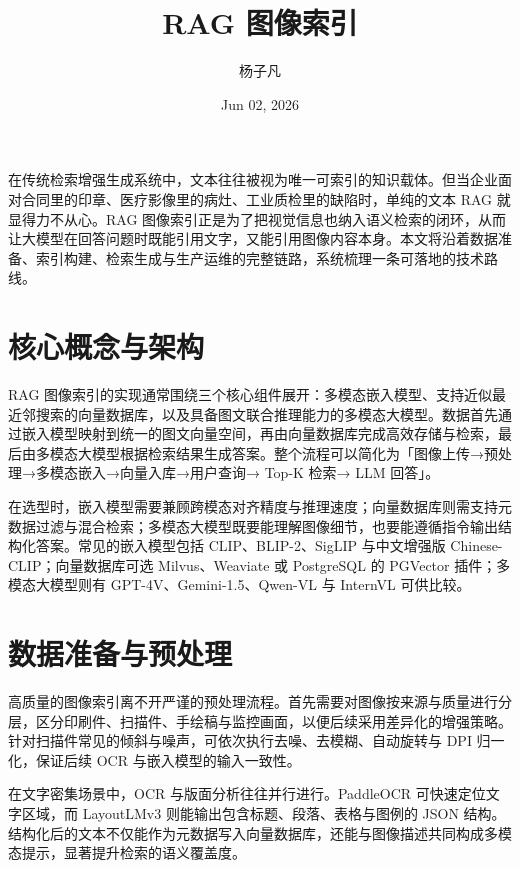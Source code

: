 \title{RAG 图像索引}
\author{杨子凡}
\date{Jun 02, 2026}
\maketitle
在传统检索增强生成系统中，文本往往被视为唯一可索引的知识载体。但当企业面对合同里的印章、医疗影像里的病灶、工业质检里的缺陷时，单纯的文本 RAG 就显得力不从心。RAG 图像索引正是为了把视觉信息也纳入语义检索的闭环，从而让大模型在回答问题时既能引用文字，又能引用图像内容本身。本文将沿着数据准备、索引构建、检索生成与生产运维的完整链路，系统梳理一条可落地的技术路线。\par
\chapter{核心概念与架构}
RAG 图像索引的实现通常围绕三个核心组件展开：多模态嵌入模型、支持近似最近邻搜索的向量数据库，以及具备图文联合推理能力的多模态大模型。数据首先通过嵌入模型映射到统一的图文向量空间，再由向量数据库完成高效存储与检索，最后由多模态大模型根据检索结果生成答案。整个流程可以简化为「图像上传→预处理→多模态嵌入→向量入库→用户查询→ Top-K 检索→ LLM 回答」。\par
在选型时，嵌入模型需要兼顾跨模态对齐精度与推理速度；向量数据库则需支持元数据过滤与混合检索；多模态大模型既要能理解图像细节，也要能遵循指令输出结构化答案。常见的嵌入模型包括 CLIP、BLIP-2、SigLIP 与中文增强版 Chinese-CLIP；向量数据库可选 Milvus、Weaviate 或 PostgreSQL 的 PGVector 插件；多模态大模型则有 GPT-4V、Gemini-1.5、Qwen-VL 与 InternVL 可供比较。\par
\chapter{数据准备与预处理}
高质量的图像索引离不开严谨的预处理流程。首先需要对图像按来源与质量进行分层，区分印刷件、扫描件、手绘稿与监控画面，以便后续采用差异化的增强策略。针对扫描件常见的倾斜与噪声，可依次执行去噪、去模糊、自动旋转与 DPI 归一化，保证后续 OCR 与嵌入模型的输入一致性。\par
在文字密集场景中，OCR 与版面分析往往并行进行。PaddleOCR 可快速定位文字区域，而 LayoutLMv3 则能输出包含标题、段落、表格与图例的 JSON 结构。结构化后的文本不仅能作为元数据写入向量数据库，还能与图像描述共同构成多模态提示，显著提升检索的语义覆盖度。\par
